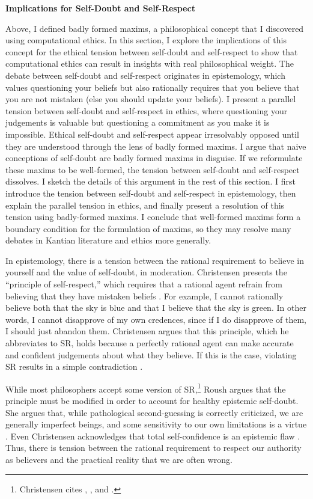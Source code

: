 \begin{isabellebody}
\begin{isamarkuptext}
\noindent \textbf{Implications for Self-Doubt and Self-Respect}

Above, I defined badly formed maxims, a philosophical concept that I discovered
using computational ethics. In this section, I explore the implications of this concept for the ethical
tension between self-doubt and self-respect to show that computational ethics can result in insights with real 
philosophical weight. The debate between self-doubt and self-respect originates in epistemology, which 
values questioning your beliefs but also rationally requires that you believe that you are not mistaken 
(else you should update your beliefs). I present a parallel tension between self-doubt and self-respect
in ethics, where questioning your judgements is valuable but 
questioning a commitment as you make it is impossible. Ethical self-doubt and self-respect appear 
irresolvably opposed until they are understood through the lens of badly formed maxims. I argue that naive
conceptions of self-doubt are badly formed maxims in disguise. If we reformulate these maxims to be well-formed,
the tension between self-doubt and self-respect dissolves. I sketch the details of this argument in 
the rest of this section. I first introduce the tension between self-doubt and self-respect 
in epistemology, then explain the parallel tension in ethics, and finally present a resolution of this 
tension using badly-formed maxims. I conclude that well-formed maxims form a boundary condition for
the formulation of maxims, so they may resolve many debates in Kantian literature and ethics more generally.

In epistemology, there is a tension between the rational requirement to believe in yourself and the 
value of self-doubt, in moderation. Christensen presents the ``principle of self-respect,'' which requires 
that a rational agent refrain from believing that they have mistaken beliefs \cite[4]{christensen}. For example, I cannot 
rationally believe both that the sky is blue and that I believe that the sky is green. In other words, I cannot 
disapprove of my own credences, since if I do disapprove of them, I should just abandon them. Christensen 
argues that this principle, which he abbreviates to SR, holds because 
a perfectly rational agent can make accurate and confident judgements about what they believe. If this 
is the case, violating SR results in a simple contradiction \cite[8-9]{christensen}. 

While most philosophers accept some version of SR,\footnote{Christensen cites \citet{vanfraassen}, 
\citet{vickers}, and \citet{koons}.}
Roush argues that the principle must be modified in order to account for healthy epistemic 
self-doubt. She argues that, while pathological second-guessing is correctly criticized, we are generally 
imperfect beings, and some sensitivity to our own limitations is a virtue \cite[2]{roushselfhelp}. Even Christensen 
acknowledges that total self-confidence is an epistemic flaw \cite[1]{christensen}. Thus, there is tension between the rational
requirement to respect our authority as believers and the practical reality that we are often wrong. 


\end{isamarkuptext}
\end{isabellebody}
